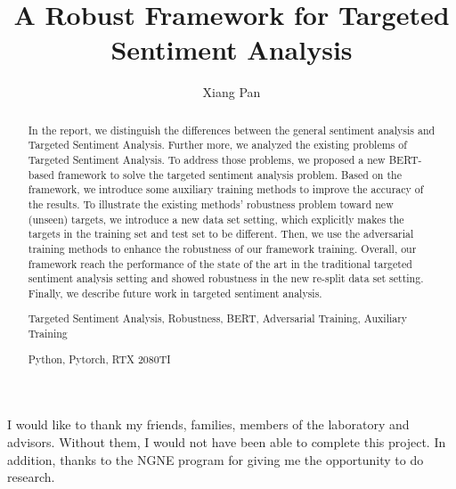 \documentclass[fyp]{socreport}
\begin{document}
\title{A Robust Framework for Targeted Sentiment Analysis}
\author{Xiang Pan}


\maketitle
\begin{abstract}
In the report, we distinguish the differences between the general sentiment analysis and Targeted Sentiment Analysis. Further more, we analyzed the existing problems of Targeted Sentiment Analysis. To address those problems, we proposed a new BERT-based framework to solve the targeted sentiment analysis problem. Based on the framework, we introduce some auxiliary training methods to improve the accuracy of the results. To illustrate the existing methods' robustness problem toward new (unseen) targets, we introduce a new data set setting, which explicitly makes the targets in the training set and test set to be different. Then, we use the adversarial training methods to enhance the robustness of our framework training. Overall, our framework reach the performance of the state of the art in the traditional targeted sentiment analysis setting and showed robustness in the new re-split data set setting. Finally, we describe future work in targeted sentiment analysis.


\begin{keywords}
	Targeted Sentiment Analysis, Robustness, BERT, Adversarial Training, Auxiliary Training
\end{keywords}
\begin{implement}
	Python, Pytorch, RTX 2080TI
\end{implement}
\end{abstract}

\begin{acknowledgement}
   I would like to thank my friends, families, members of the laboratory and advisors.
   Without them, I would not have been able to complete this project.
   In addition, thanks to the NGNE program for giving me the opportunity to do research.
\end{acknowledgement}
\end{document}
